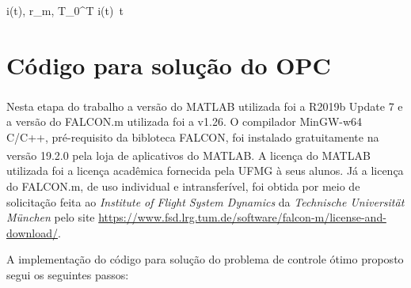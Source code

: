 \begin{mini!}
	{i(t), r_m, T}{\int_{0}^{T} i(t)  \,t \label{eq:ObjOCP}}
	{\label{eq:formulacaoOCP}}{}
\end{mini!}


\section{Código para solução do OPC}
\label{sec:metodologia_codigos}

Nesta etapa do trabalho a versão do MATLAB\textsuperscript{\textregistered} utilizada foi a R2019b Update 7 e a versão do FALCON.m utilizada foi a v1.26.
O compilador MinGW-w64 C/C++, pré-requisito da bibloteca FALCON, foi instalado gratuitamente na versão 19.2.0 pela loja de aplicativos do MATLAB\textsuperscript{\textregistered}. 
A licença do MATLAB\textsuperscript{\textregistered} utilizada foi a licença acadêmica fornecida pela UFMG à seus alunos. Já a licença do FALCON.m, de uso individual e intransferível,
foi obtida por meio de solicitação feita ao \textit{Institute of Flight System Dynamics} da \textit{Technische Universit{\"a}t M{\"u}nchen} pelo site \url{https://www.fsd.lrg.tum.de/software/falcon-m/license-and-download/}.

A implementação do código para solução do problema de controle ótimo proposto segui os seguintes passos:

